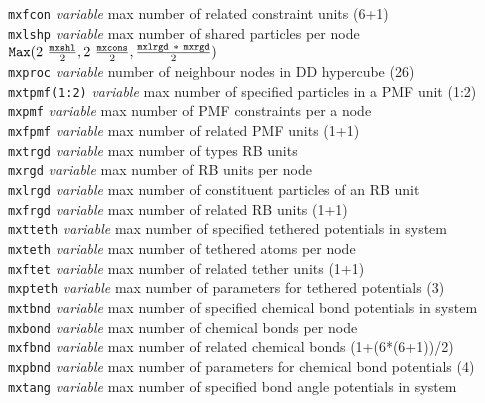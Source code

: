 \begin{tabbing}
\> {\tt mxfcon}      \> {\em variable}     \> max number of related constraint units (6+1) \\
\> {\tt mxlshp}      \> {\em variable}     \> max number of shared particles per node \\
\>                   \>                    \> ${\tt Max} (2~\frac{\tt mxshl}{2},2~\frac{\tt mxcons}{2},\frac{{\tt mxlrgd}~*~{\tt mxrgd}}{2})$ \\
\> {\tt mxproc}      \> {\em variable}     \> number of neighbour nodes in DD hypercube (26) \\
\> {\tt mxtpmf(1:2)} \> {\em variable}     \> max number of specified particles in a PMF unit (1:2) \\
\> {\tt mxpmf}       \> {\em variable}     \> max number of PMF constraints per a node \\
\> {\tt mxfpmf}      \> {\em variable}     \> max number of related PMF units (1+1) \\
\> {\tt mxtrgd}      \> {\em variable}     \> max number of types RB units \\
\> {\tt mxrgd}       \> {\em variable}     \> max number of RB units per node \\
\> {\tt mxlrgd}      \> {\em variable}     \> max number of constituent particles of an RB unit \\
\> {\tt mxfrgd}      \> {\em variable}     \> max number of related RB units (1+1) \\
\> {\tt mxtteth}     \> {\em variable}     \> max number of specified tethered potentials in system \\
\> {\tt mxteth}      \> {\em variable}     \> max number of tethered atoms per node \\
\> {\tt mxftet}      \> {\em variable}     \> max number of related tether units (1+1) \\
\> {\tt mxpteth}     \> {\em variable}     \> max number of parameters for tethered potentials (3) \\
\> {\tt mxtbnd}      \> {\em variable}     \> max number of specified chemical bond potentials in system \\
\> {\tt mxbond}      \> {\em variable}     \> max number of chemical bonds per node \\
\> {\tt mxfbnd}      \> {\em variable}     \> max number of related chemical bonds (1+(6*(6+1))/2) \\
\> {\tt mxpbnd}      \> {\em variable}     \> max number of parameters for chemical bond potentials (4) \\
\> {\tt mxtang}      \> {\em variable}     \> max number of specified bond angle potentials in system \\

\end{tabbing}
